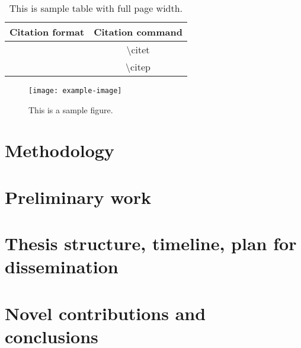 \documentclass[10pt]{article}
\begin{document}
\begin{multicols*}{2}



\begin{table*}
        \centering
        \begin{tabular}{cc}
                \hline
                \textbf{Citation format} & \textbf{Citation command} \\
                \hline
                \citet{APA:83} & \textbackslash{}citet{} \\
                \citep{APA:83} & \textbackslash{}citep{} \\
                \hline
        \end{tabular}
        \caption{This is sample table with full page width.}
        \label{tbl:tbl1}
\end{table*}

\begin{figure}[H]
    \centering
        \texttt{[image: example-image]}
        \caption{This is a sample figure.}
        \label{fig:fig1}
\end{figure}

\section{Methodology}

\section{Preliminary work}

\section{Thesis structure, timeline, plan for dissemination}

\section{Novel contributions and conclusions}

\end{multicols*}

\clearpage



\end{document}
